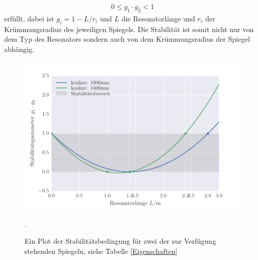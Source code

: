 \begin{align}
0\le g_1\cdot g_2 < 1
\end{align}
erfüllt, dabei ist $g_i=1-L/r_i$ und $L$ die Resonatorlänge und $r_i$ der Krümmungsradius des jeweiligen Spiegels. Die Stabilität ist somit nicht nur von dem Typ des Resonators sondern auch von dem Krümmungsradius der Spiegel abhängig.
\begin{figure}
\centering
\includegraphics[scale=1]{../Grafiken/Stabilitaetsparameter.pdf}
\caption{Ein Plot der Stabilitätsbedingung für zwei der zur Verfügung stehenden Spiegeln, siehe Tabelle \ref{Eigenschaften}}.
\end{figure}
